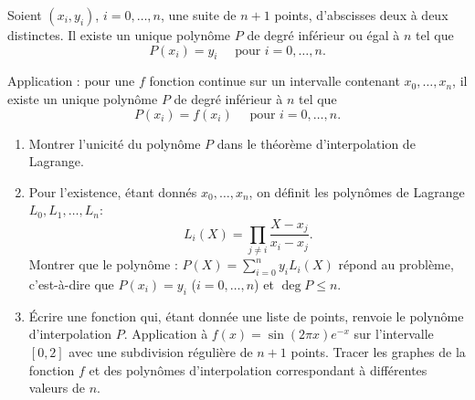 \begin{frame}
\begin{theoreme}
Soient $(x_i,y_i)$, $i=0,\ldots,n$, une suite de $n+1$ points, d'abscisses deux à deux distinctes. 
Il existe un unique polynôme $P$ de degré inférieur ou égal à $n$ tel que
$$P(x_i)=y_i \quad \text{ pour } i=0,\ldots,n.$$
\end{theoreme}

\pause
\bigskip

Application : 
pour une $f$ fonction continue sur un intervalle contenant $x_0,\ldots,x_n$, 
il existe un unique polynôme $P$ de degré inférieur à $n$ tel que
$$P(x_i)=f(x_i) \quad \text{ pour } i=0,\ldots,n.$$

\end{frame}


\begin{frame}
\begin{tp}
\begin{enumerate}
  \item Montrer l'unicité du polynôme $P$ dans le théorème d'interpolation de Lagrange. \pause 
  
  \item Pour l'existence, étant donnés $x_0,\ldots, x_n$, on définit les polynômes de Lagrange $L_0,L_1,\ldots,L_n$:
  $$L_i(X) = \prod_{j \neq i} \frac{X-x_j}{x_i-x_j}.$$
  Montrer que le polynôme :
  $P(X) = \sum_{i=0}^{n} y_i L_i(X)$
  répond au problème, c'est-à-dire que $P(x_i)=y_i$ ($i=0,\ldots,n$) et $\deg P \le n$.
  \pause
  \item \'Ecrire une fonction qui, étant donnée une liste de points, renvoie le polynôme
  d'interpolation $P$. Application à $f(x) = \sin(2\pi x)e^{-x}$
  sur l'intervalle $[0,2]$ avec une subdivision régulière de $n+1$ points.
  Tracer les graphes de la fonction $f$ et des polynômes d'interpolation
  correspondant à différentes valeurs de $n$.
  
\end{enumerate}
\end{tp}
\end{frame}

